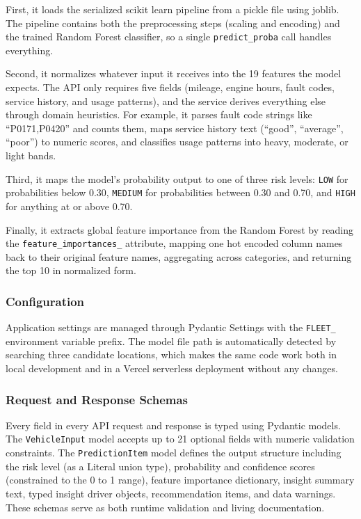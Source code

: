 \documentclass[conference]{IEEEtran}
\begin{document}
First, it loads the serialized scikit learn pipeline from a pickle file using joblib. The pipeline contains both the preprocessing steps (scaling and encoding) and the trained Random Forest classifier, so a single \texttt{predict\_proba} call handles everything.

Second, it normalizes whatever input it receives into the 19 features the model expects. The API only requires five fields (mileage, engine hours, fault codes, service history, and usage patterns), and the service derives everything else through domain heuristics. For example, it parses fault code strings like ``P0171,P0420'' and counts them, maps service history text (``good'', ``average'', ``poor'') to numeric scores, and classifies usage patterns into heavy, moderate, or light bands.

Third, it maps the model's probability output to one of three risk levels: \texttt{LOW} for probabilities below 0.30, \texttt{MEDIUM} for probabilities between 0.30 and 0.70, and \texttt{HIGH} for anything at or above 0.70.

Finally, it extracts global feature importance from the Random Forest by reading the \texttt{feature\_importances\_} attribute, mapping one hot encoded column names back to their original feature names, aggregating across categories, and returning the top 10 in normalized form.

\subsubsection{Configuration}
Application settings are managed through Pydantic Settings with the \texttt{FLEET\_} environment variable prefix. The model file path is automatically detected by searching three candidate locations, which makes the same code work both in local development and in a Vercel serverless deployment without any changes.

\subsubsection{Request and Response Schemas}
Every field in every API request and response is typed using Pydantic models. The \texttt{VehicleInput} model accepts up to 21 optional fields with numeric validation constraints. The \texttt{PredictionItem} model defines the output structure including the risk level (as a Literal union type), probability and confidence scores (constrained to the 0 to 1 range), feature importance dictionary, insight summary text, typed insight driver objects, recommendation items, and data warnings. These schemas serve as both runtime validation and living documentation.
\end{document}
